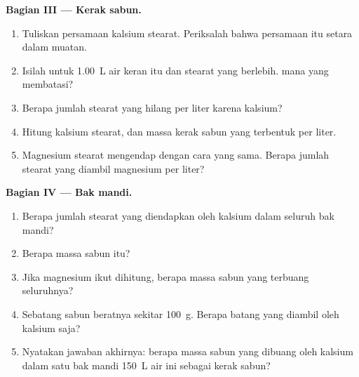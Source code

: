 \begin{problem}
\medskip
\noindent\textbf{Bagian III --- Kerak sabun.}
\begin{enumerate}[resume]
  \item Tuliskan persamaan  kalsium stearat.
        Periksalah bahwa persamaan itu setara dalam muatan.
  \item Isilah  untuk \qty{1.00}{L} air keran itu dan 
        stearat yang berlebih.  mana yang membatasi?
  \item Berapa jumlah  stearat yang hilang per liter karena kalsium?
  \item Hitung  kalsium stearat, dan massa kerak sabun yang
        terbentuk per liter.
  \item Magnesium stearat mengendap dengan cara yang sama. Berapa jumlah
        stearat yang diambil  magnesium per liter?
\end{enumerate}

\medskip
\noindent\textbf{Bagian IV --- Bak mandi.}
\begin{enumerate}[resume]
  \item Berapa jumlah  stearat yang diendapkan oleh kalsium dalam
        seluruh bak mandi?
  \item Berapa massa sabun itu?
  \item Jika magnesium ikut dihitung, berapa massa sabun yang terbuang
        seluruhnya?
  \item Sebatang sabun beratnya sekitar \qty{100}{g}. Berapa batang yang
        diambil oleh kalsium saja?
  \item Nyatakan jawaban akhirnya: berapa massa sabun yang dibuang oleh
        kalsium dalam satu bak mandi \qty{150}{L} air ini sebagai kerak
        sabun?
\end{enumerate}
\end{problem}

